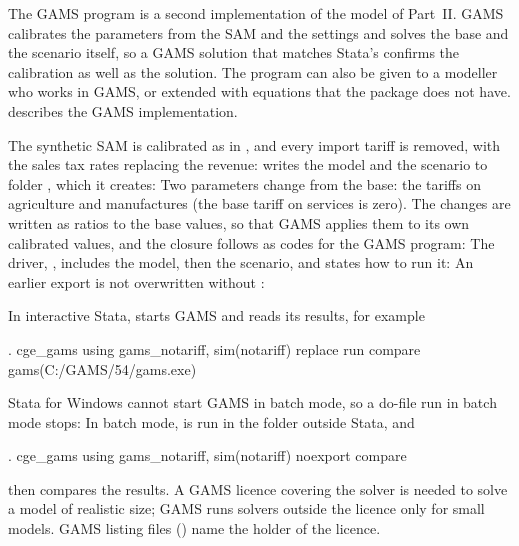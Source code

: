 
The GAMS program is a second implementation of the model of Part~II. GAMS
calibrates the parameters from the SAM and the settings and solves the base
and the scenario itself, so a GAMS solution that matches Stata's confirms the
calibration as well as the solution. The program can also be given to a
modeller who works in GAMS, or extended with equations that the package does
not have.  describes the GAMS implementation.


The synthetic SAM is calibrated as in , and every import
tariff is removed, with the sales tax rates replacing the revenue:
 writes the model and the scenario to folder
, which it creates:
Two parameters change from the base: the tariffs on agriculture and
manufactures (the base tariff on services is zero). The changes are written as
ratios to the base values, so that GAMS applies them to its own calibrated
values, and the closure follows as codes for the GAMS program:
The driver, , includes the model, then the scenario, and
states how to run it:
An earlier export is not overwritten without :


In interactive Stata,  starts GAMS and  reads its
results, for example
\begin{stcode}
. cge_gams using gams_notariff, sim(notariff) replace run compare gams(C:/GAMS/54/gams.exe)
\end{stcode}
Stata for Windows cannot start GAMS in batch mode, so a do-file run in batch
mode stops:
In batch mode,  is run in the folder outside Stata, and
\begin{stcode}
. cge_gams using gams_notariff, sim(notariff) noexport compare
\end{stcode}
then compares the results. A GAMS licence covering the solver is needed to
solve a model of realistic size; GAMS runs solvers outside the licence only
for small models. GAMS listing files () name the holder of the
licence.


